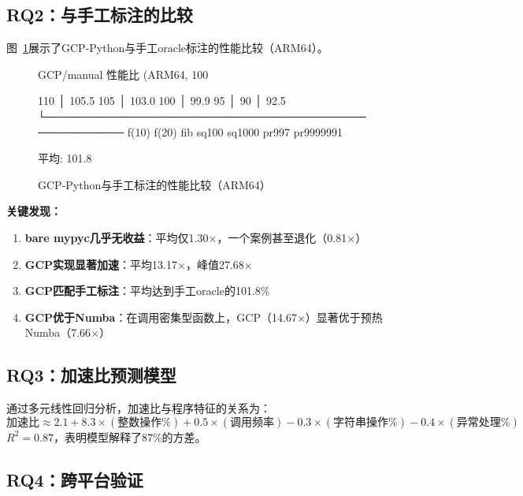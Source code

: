 \documentclass[UTF8]{article}
\begin{document}
\subsection{RQ2：与手工标注的比较}

图~\ref{fig:oracle}展示了GCP-Python与手工oracle标注的性能比较（ARM64）。

\begin{figure}[h]
\centering
\begin{asciiart}
GCP/manual 性能比 (ARM64, 100%

110%
     │  105.5%
105%
     │  103.0%
100%
     │  99.9%
 95%
     │
 90%
     │      92.5%
     └────────────────────────────────────────────────────
       f(10) f(20) fib  sq100 sq1000 pr997 pr9999991

平均: 101.8%
\end{asciiart}
\caption{GCP-Python与手工标注的性能比较（ARM64）}
\label{fig:oracle}
\end{figure}

\textbf{关键发现：}
\begin{enumerate}[leftmargin=2em]
\item \textbf{bare mypyc几乎无收益}：平均仅1.30$\times$，一个案例甚至退化（0.81$\times$）
\item \textbf{GCP实现显著加速}：平均13.17$\times$，峰值27.68$\times$
\item \textbf{GCP匹配手工标注}：平均达到手工oracle的101.8\%
\item \textbf{GCP优于Numba}：在调用密集型函数上，GCP（14.67$\times$）显著优于预热Numba（7.66$\times$）
\end{enumerate}

\subsection{RQ3：加速比预测模型}

通过多元线性回归分析，加速比与程序特征的关系为：
\[
\text{加速比} \approx 2.1 + 8.3 \times (\text{整数操作\%}) + 0.5 \times (\text{调用频率}) - 0.3 \times (\text{字符串操作\%}) - 0.4 \times (\text{异常处理\%})
\]
$R^2 = 0.87$，表明模型解释了87\%的方差。

\subsection{RQ4：跨平台验证}
\end{document}
